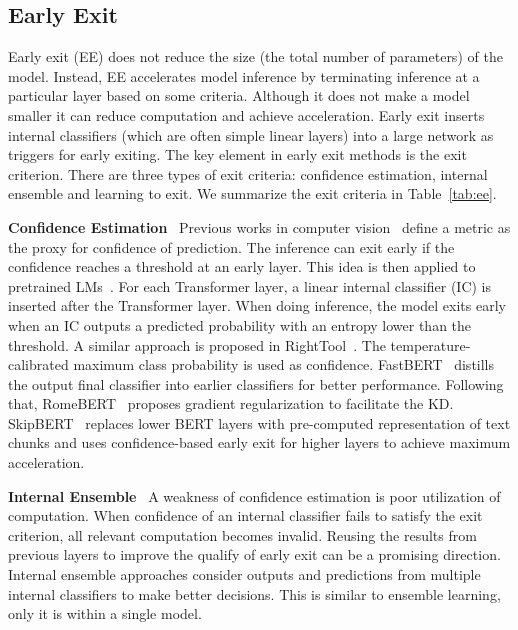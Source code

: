 \documentclass[letterpaper]{article} %
\newcommand{\paratitle}[1]{\noindent\textbf{#1}\ }
\begin{document}
\subsection{Early Exit}
\label{sec:ee}
Early exit (EE) does not reduce the size (the total number of parameters) of the model. Instead, EE accelerates model inference by terminating inference at a particular layer based on some criteria. Although it does not make a model smaller it can reduce computation and achieve acceleration.
Early exit inserts internal classifiers (which are often simple linear layers) into a large network as triggers for early exiting. The key element in early exit methods is the exit criterion. There are three types of exit criteria: confidence estimation, internal ensemble and learning to exit. We summarize the exit criteria in Table~\ref{tab:ee}.

\paratitle{Confidence Estimation} Previous works in computer vision~\citep{park2015big,branchynet,shallowdeep} define a metric as the proxy for confidence of prediction. The inference can exit early if the confidence reaches a threshold at an early layer. This idea is then applied to pretrained LMs~\citep{deebert}. For each Transformer layer, a linear internal classifier (IC) is inserted after the Transformer layer. When doing inference, the model exits early when an IC outputs a predicted probability with an entropy lower than the threshold. A similar approach is proposed in RightTool~\citep{schwartz2020right}. The temperature-calibrated maximum class probability is used as confidence. FastBERT~\citep{fastbert} distills the output final classifier into earlier classifiers for better performance. Following that, RomeBERT~\citep{geng2021romebert} proposes gradient regularization to facilitate the KD. SkipBERT~\citep{skipbert} replaces lower BERT layers with pre-computed representation of text chunks and uses confidence-based early exit for higher layers to achieve maximum acceleration.


\paratitle{Internal Ensemble}
A weakness of confidence estimation is poor utilization of computation. When confidence of an internal classifier fails to satisfy the exit criterion, all relevant computation becomes invalid. Reusing the results from previous layers to improve the qualify of early exit can be a promising direction. Internal ensemble approaches consider outputs and predictions from multiple internal classifiers to make better decisions. This is similar to ensemble learning, only it is within a single model.
\end{document}
